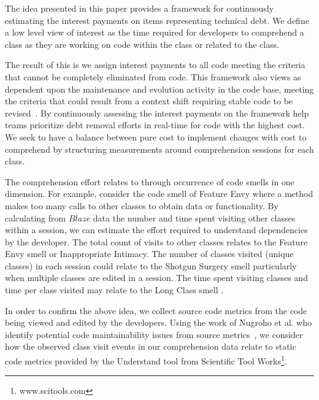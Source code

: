 The idea presented in this paper provides a framework for continuously estimating the interest payments on items representing technical debt.  We define a low level view of interest as the time required for developers to comprehend a class as they are working on code within the class or related to the class.   

The result of this is we assign interest payments to all code meeting the criteria that \TD cannot be completely eliminated from code.  This framework also views \TD as dependent upon the maintenance and evolution activity in the code base, meeting the criteria that \TD could result from a context shift requiring stable code to be revised~\cite{Ozkaya2012Technical}. By continuously assessing the interest payments on \TD the framework help teams prioritize debt removal efforts in real-time for code with the highest cost.  We seek to have a balance between pure cost to implement changes with cost to comprehend by structuring measurements around comprehension sessions for each class.

The comprehension effort relates to \TD through occurrence of code smells in one dimension.  For example, consider the code smell of Feature Envy where a method makes too many calls to other classes to obtain data or functionality.  By calculating from $Blaze$ data the number and time spent visiting other classes within a session, we can estimate the effort required to understand dependencies by the developer.  The total count of visits to other classes relates to the Feature Envy smell or Inappropriate Intimacy.  The number of classes visited (unique classes) in each session could  relate to the Shotgun Surgery smell particularly when multiple classes are edited in a session.  The time spent visiting classes and time per class visited may relate to the Long Class smell \cite{Fowler_etal:1999}.  

In order to confirm the above idea, we collect source code metrics from the code being viewed and edited by the developers.  Using the work of Nugroho et al. who identify potential code maintainability issues from source metrics~\cite{Nugroho2011Empirical}, we consider how the observed class visit events in our comprehension data relate to static code metrics provided by the Understand tool from Scientific Tool Works\footnote{www.scitools.com}.   
